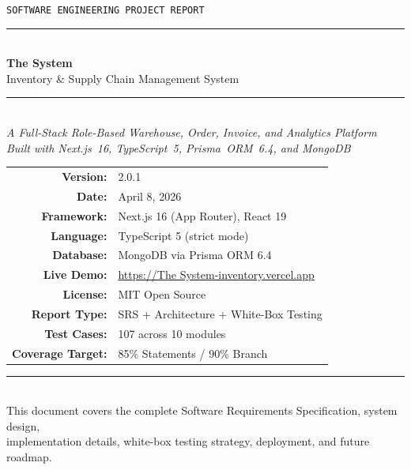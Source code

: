 \documentclass[12pt,a4paper]{report}
\begin{document}
\begin{titlepage}
  \pagecolor{titlebg}\color{white}\centering
  \vspace*{1.2cm}
  {\fontsize{11}{14}\selectfont\texttt{\color{secondary}SOFTWARE ENGINEERING PROJECT REPORT}}\\[0.4cm]
  \rule{14cm}{0.5pt}\\[0.9cm]
  {\fontsize{44}{54}\selectfont\bfseries\color{white}The System}\\[0.3cm]
  {\fontsize{17}{22}\selectfont\color{secondary}Inventory \& Supply Chain Management System}\\[0.7cm]
  \rule{14cm}{0.5pt}\\[0.9cm]
  {\large\itshape\color{white!85}
    A Full-Stack Role-Based Warehouse, Order, Invoice, and Analytics Platform\\[0.2cm]
    Built with Next.js~16, TypeScript~5, Prisma~ORM~6.4, and MongoDB
  }\\[2.2cm]
  \begin{tabular}{rl}
    \textbf{\color{secondary}Version:}         & \color{white}2.0.1 \\[4pt]
    \textbf{\color{secondary}Date:}            & \color{white}April 8, 2026 \\[4pt]
    \textbf{\color{secondary}Framework:}       & \color{white}Next.js 16 (App Router), React 19 \\[4pt]
    \textbf{\color{secondary}Language:}        & \color{white}TypeScript 5 (strict mode) \\[4pt]
    \textbf{\color{secondary}Database:}        & \color{white}MongoDB via Prisma ORM 6.4 \\[4pt]
    \textbf{\color{secondary}Live Demo:}       & \color{secondary}\url{https://The System-inventory.vercel.app} \\[4pt]
    \textbf{\color{secondary}License:}         & \color{white}MIT Open Source \\[4pt]
    \textbf{\color{secondary}Report Type:}     & \color{white}SRS + Architecture + White-Box Testing \\[4pt]
    \textbf{\color{secondary}Test Cases:}      & \color{white}107 across 10 modules \\[4pt]
    \textbf{\color{secondary}Coverage Target:} & \color{white}85\% Statements / 90\% Branch \\
  \end{tabular}
  \vfill
  \rule{14cm}{0.5pt}\\[0.4cm]
  {\small\color{white!55}
    This document covers the complete Software Requirements Specification, system design,\\
    implementation details, white-box testing strategy, deployment, and future roadmap.
  }
\end{titlepage}
\pagecolor{white}\color{black}
\end{document}
